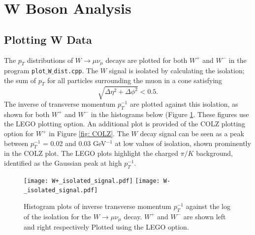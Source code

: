 \documentclass[a4paper]{article}
\begin{document}
\section{W Boson Analysis} \label{sec: W boson}

\subsection{Plotting W Data} \label{sec: W plotting}

The $p_T$ distributions of $W \xrightarrow{} \mu \nu_\mu$ decays are plotted for both $W^+$ and $W^-$ in the program \texttt{plot$\_$W$\_$dist.cpp}. 
The $W$ signal is isolated by calculating the isolation; the sum of $p_T$ for all particles surrounding the muon in a cone satisfying
\begin{equation}
    \sqrt{\Delta\eta^2 + \Delta\phi^2} < 0.5.
    \label{eq: isolation}
\end{equation}
The inverse of transverse momentum $p_T^{-1}$ are plotted against this isolation, as shown for both $W^+$ and $W^-$ in the histograms below (Figure \ref{fig: LEGO}. These figures use the LEGO plotting option. An additional plot is provided of the COLZ plotting option for $W^+$ in Figure \ref{fig: COLZ}. %
The $W$ decay signal can be seen as a peak between $p_T^{-1}$ = 0.02 and 0.03 GeV$^{-1}$ at low values of isolation, shown prominently in the COLZ plot. The LEGO plots highlight the charged $\pi/K$ background, identified as the Gaussian peak at high $p_T^{-1}$.


\begin{figure}[t]
\centering
\texttt{[image: W+\_isolated\_signal.pdf]}
\texttt{[image: W-\_isolated\_signal.pdf]} %
\vspace{-4mm}
\caption{\small Histogram plots of inverse transverse momentum $p_T^{-1}$ against the log of the isolation for the $W \xrightarrow{} \mu \nu_\mu$ decay. $W^+$ and $W^-$ are shown left and right respectively Plotted using the LEGO option.}
\label{fig: LEGO}
\end{figure}
\end{document}
